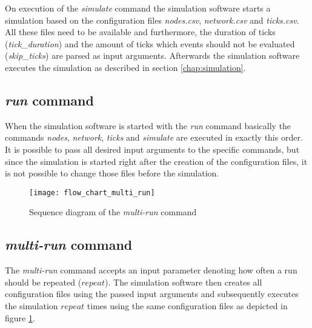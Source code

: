 On execution of the \textit{simulate} command the simulation software starts a simulation based on the configuration files \textit{nodes.csv}, \textit{network.csv} and \textit{ticks.csv}.
All these files need to be available and furthermore, the duration of ticks (\textit{tick\_duration}) and the amount of ticks which events should not be evaluated (\textit{skip\_ticks}) are parsed as input arguments.
Afterwards the simulation software executes the simulation as described in section \ref{chap:simulation}.

\subsection{\textit{run} command} \label{chap:run_command}

When the simulation software is started with the \textit{run} command basically the commands \textit{nodes}, \textit{network}, \textit{ticks} and \textit{simulate} are executed in exactly this order.
It is possible to pass all desired input arguments to the specific commands, but since the simulation is started right after the creation of the configuration files, it is not possible to change those files before the simulation.

\begin{figure}[t]
\texttt{[image: flow\_chart\_multi\_run]}
\centering
\caption{Sequence diagram of the \textit{multi-run} command}
\label{fig:flow_chart_multi_run}
\end{figure}

\subsection{\textit{multi-run} command} \label{chap:multi_run_command}

The \textit{multi-run} command accepts an input parameter denoting how often a run should be repeated ($repeat$).
The simulation software then creates all configuration files using the passed input arguments and subsequently executes the simulation $repeat$ times using the same configuration files as depicted in figure \ref{fig:flow_chart_multi_run}.

